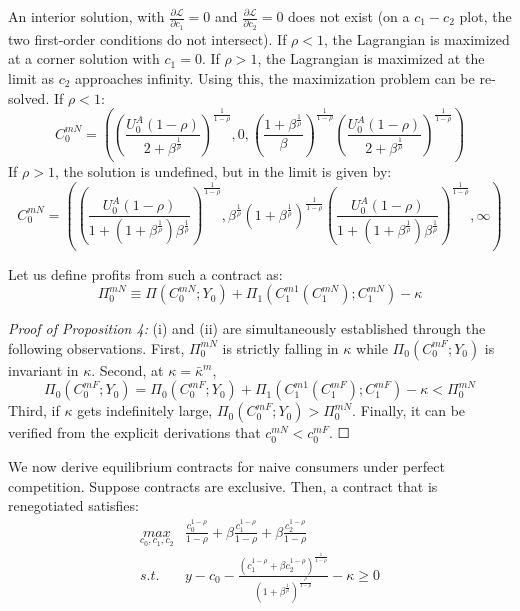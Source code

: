 \documentclass[11pt,english]{article}
\theoremstyle{plain}
\theoremstyle{definition}
\begin{document}
An interior solution, with $\frac{\partial\mathcal{L}}{\partial c_{1}}=0$
and $\frac{\partial\mathcal{L}}{\partial c_{2}}=0$ does not exist
(on a $c_{1}-c_{2}$ plot, the two first-order conditions do not intersect).
If $\rho<1$, the Lagrangian is maximized at a corner solution with
$c_{1}=0$. If $\rho>1$, the Lagrangian is maximized at the limit
as $c_{2}$ approaches infinity. Using this, the maximization problem
can be re-solved. If $\rho<1$: 
\begin{equation}
C_{0}^{mN}=\left(\left(\frac{U_{0}^{A}\left(1-\rho\right)}{2+\beta^{\frac{1}{\rho}}}\right)^{\frac{1}{1-\rho}},0,\left(\frac{1+\beta^{\frac{1}{\rho}}}{\beta}\right)^{\frac{1}{1-\rho}}\left(\frac{U_{0}^{A}\left(1-\rho\right)}{2+\beta^{\frac{1}{\rho}}}\right)^{\frac{1}{1-\rho}}\right)\label{eq:naive-monopolist-contract1}
\end{equation}
If $\rho>1$, the solution is undefined, but in the limit is given
by: 
\begin{equation}
C_{0}^{mN}=\left(\left(\frac{U_{0}^{A}\left(1-\rho\right)}{1+\left(1+\beta^{\frac{1}{\rho}}\right)\beta^{\frac{1}{\rho}}}\right)^{\frac{1}{1-\rho}},\beta^{\frac{1}{\rho}}\left(1+\beta^{\frac{1}{\rho}}\right)^{\frac{1}{1-\rho}}\left(\frac{U_{0}^{A}\left(1-\rho\right)}{1+\left(1+\beta^{\frac{1}{\rho}}\right)\beta^{\frac{1}{\rho}}}\right)^{\frac{1}{1-\rho}},\infty\right)\label{eq:naive-monopolist-contract2}
\end{equation}

Let us define profits from such a contract as: 
\[
\Pi_{0}^{mN}\equiv\Pi\left(C_{0}^{mN};Y_{0}\right)+\Pi_{1}\left(C_{1}^{m1}\left(C_{1}^{mN}\right);C_{1}^{mN}\right)-\kappa
\]

\emph{Proof of Proposition 4:} (i) and (ii) are simultaneously
established through the following observations. First, $\Pi_{0}^{mN}$
is strictly falling in $\kappa$ while $\Pi_{0}\left(C_{0}^{mF};Y_{0}\right)$
is invariant in $\kappa$. Second, at $\kappa=\bar{\kappa}^{m}$,
\begin{equation}
\Pi_{0}\left(C_{0}^{mF};Y_{0}\right)=\Pi_{0}\left(C_{0}^{mF};Y_{0}\right)+\Pi_{1}\left(C_{1}^{m1}\left(C_{1}^{mF}\right);C_{1}^{mF}\right)-\kappa<\Pi_{0}^{mN}
\end{equation}
Third, if $\kappa$ gets indefinitely large, $\Pi_{0}\left(C_{0}^{mF};Y_{0}\right)>\Pi_{0}^{mN}$.
Finally, it can be verified from the explicit derivations that $c_{0}^{mN}<c_{0}^{mF}$.
$\Square$

We now derive equilibrium contracts for naive consumers under perfect
competition. Suppose contracts are exclusive. Then, a contract that
is renegotiated satisfies: 
\begin{align}
\underset{c_{0},c_{1},c_{2}}{max} & \frac{c_{0}^{1-\rho}}{1-\rho}+\beta\frac{c_{1}^{1-\rho}}{1-\rho}+\beta\frac{c_{2}^{1-\rho}}{1-\rho}\\
s.t. & y-c_{0}-\frac{\left(c_{1}^{1-\rho}+\beta c_{2}^{1-\rho}\right)^{\frac{1}{1-\rho}}}{\left(1+\beta^{\frac{1}{\rho}}\right)^{\frac{\rho}{1-\rho}}}-\kappa\geq0
\end{align}
\end{document}
